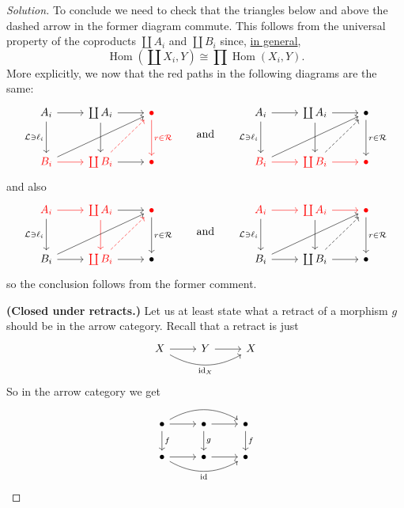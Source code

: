 \documentclass{article}
\numberwithin{equation}{section}
\newcommand{\Lc}{\mathcal{L}}
\newcommand{\Rc}{\mathcal{R}}
\DeclareMathOperator{\id}{id}
\DeclareMathOperator{\Hom}{Hom}
\begin{document}
\begin{proof}[Solution]
	To conclude we need to check that the triangles below and above the dashed arrow in the former diagram commute. This follows from the universal property of the coproducts $\coprod A_i$ and $\coprod B_i$ since, \href{https://en.wikipedia.org/wiki/Coproduct#Discussion}{in general},
	\[\Hom\left(\coprod X_i,Y\right)\cong\prod\Hom(X_i,Y).\]
	More explicitly, we now that the red paths in the following diagrams are the same:
	\[\begin{tikzcd}[row sep=large]
		A_i\arrow[r]\arrow[d,"\Lc\ni\ell_i",swap]&\coprod A_i\arrow[d]\arrow[r]&{\color{red}\bullet}\arrow[d,"r\in\Rc",red]\\
		{\color{red}B_i}\arrow[r,red]\arrow[rru]&{\color{red}\coprod B_i}\arrow[r]\arrow[ur,dashed,red]&{\color{red}\bullet}
	\end{tikzcd}\qquad
		\text{and}\qquad
	\begin{tikzcd}[row sep=large]
		A_i\arrow[r]\arrow[d,"\Lc\ni\ell_i",swap]&\coprod A_i\arrow[d]\arrow[r]&\bullet\arrow[d,"r\in\Rc"]\\
		{\color{red}B_i}\arrow[r,red]\arrow[rru]&{\color{red}\coprod B_i}\arrow[r,red]\arrow[ur,dashed]&{\color{red}\bullet}
	\end{tikzcd}\]
	and also
	\[\begin{tikzcd}[row sep=large]
		{\color{red}A_i}\arrow[r,red]\arrow[d,"\Lc\ni\ell_i",swap]&{\color{red}\coprod A_i}\arrow[d,red]\arrow[r]&{\color{red}\bullet}\arrow[d,"r\in\Rc"]\\
		B_i\arrow[r]\arrow[rru]&{\color{red}\coprod B_i}\arrow[r]\arrow[ur,dashed,red]&\bullet
	\end{tikzcd}\qquad
	\text{and}\qquad
	\begin{tikzcd}[row sep=large]
		{\color{red}A_i}\arrow[r,red]\arrow[d,"\Lc\ni\ell_i",swap]&{\color{red}\coprod A_i}\arrow[d]\arrow[r,red]&{\color{red}\bullet}\arrow[d,"r\in\Rc"]\\
		B_i\arrow[r]\arrow[rru]&\coprod B_i\arrow[r]\arrow[ur,dashed]&\bullet
	\end{tikzcd}\]
	so the conclusion follows from the former comment.
	
	\textbf{(Closed under retracts.)} Let us at least state what a retract of a morphism $g$ should be in the arrow category. Recall that a retract is just
	\[\begin{tikzcd}
		X\arrow[r]\arrow[rr,bend right,"\id_X",swap]&Y\arrow[r]&X
	\end{tikzcd}\]
	So in the arrow category we get
	\[\begin{tikzcd}
		\bullet\arrow[r]\arrow[rr,bend left]\arrow[d,"f"]&\bullet\arrow[d,"g"]\arrow[r]&\bullet\arrow[d,"f"]\\
		\bullet\arrow[r]\arrow[rr,bend right,swap,"\id"]&\bullet\arrow[r]&\bullet
	\end{tikzcd}\]
\end{proof}
\end{document}
